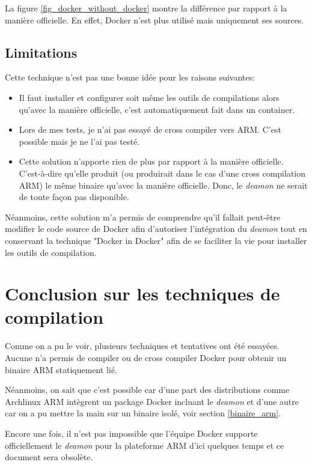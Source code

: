 \documentclass[11pt,a4paper,oneside]{report}
\begin{document}
La figure \ref{fig_docker_without_docker} montre la différence par rapport à la manière officielle. En effet, Docker n'est plus utilisé mais uniquement ses sources.

\subsection{Limitations}

Cette technique n'est pas une bonne idée pour les raisons suivantes:

\begin{itemize}
\item Il faut installer et configurer soit même les outils de compilations alors qu'avec la manière officielle, c'est automatiquement fait dans un container.
\item Lors de mes tests, je n'ai pas essayé de cross compiler vers ARM. C'est possible mais je ne l'ai pas testé.
\item Cette solution n'apporte rien de plus par rapport à la manière officielle. C'est-à-dire qu'elle produit (ou produirait dans le cas d'une cross compilation ARM) le même binaire qu'avec la manière officielle. Donc, le \textit{deamon} ne serait de toute façon pas disponible.

\end{itemize}

Néanmoins, cette solution m'a permis de comprendre qu'il fallait peut-être modifier le code source de Docker afin d'autoriser l'intégration du \textit{deamon} tout en conservant la technique "Docker in Docker" afin de se faciliter la vie pour installer les outils de compilation.

\section{Conclusion sur les techniques de compilation}

Comme on a pu le voir, plusieurs techniques et tentatives ont été essayées. Aucune n'a permis de  compiler ou de cross compiler Docker pour obtenir un binaire ARM statiquement lié.

Néanmoins, on sait que c'est possible car d'une part des distributions comme Archlinux ARM intègrent un package Docker incluant le \textit{deamon} et d'une autre car on a pu mettre la main sur un binaire isolé, voir section \ref{binaire_arm}.

Encore une fois, il n'est pas impossible que l'équipe Docker supporte officiellement le \textit{deamon} pour la plateforme ARM d'ici quelques temps et ce document sera obsolète.
\end{document}
